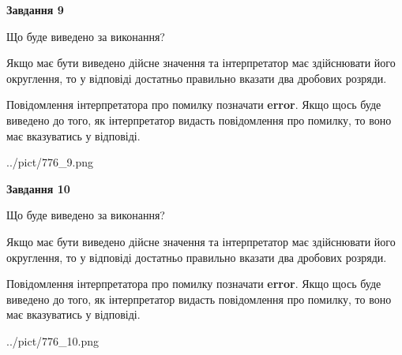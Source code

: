 \documentclass[12pt, ukrainian]{article}
\begin{document}
{\begin {Large}
{\begin {center}\textbf{Завдання 9}\end {center}}\par
Що буде виведено за виконання? \par

Якщо має бути виведено дійсне значення та інтерпретатор має здійснювати його округлення, 
то у відповіді достатньо правильно вказати два дробових розряди.

Повідомлення інтерпретатора про помилку позначати \textbf{error}.
Якщо щось буде виведено до того, як інтерпретатор видасть повідомлення про помилку, 
то воно має вказуватись у відповіді. \par

\begin{center}
	{../pict/776_9.png}
\end{center}
\newpage

{\begin {center}\textbf{Завдання 10}\end {center}}\par
Що буде виведено за виконання? \par

Якщо має бути виведено дійсне значення та інтерпретатор має здійснювати його округлення, 
то у відповіді достатньо правильно вказати два дробових розряди.

Повідомлення інтерпретатора про помилку позначати \textbf{error}.
Якщо щось буде виведено до того, як інтерпретатор видасть повідомлення про помилку, 
то воно має вказуватись у відповіді. \par

\begin{center}
	{../pict/776_10.png}
\end{center}
\newpage

\end {Large}}
\end{document}
